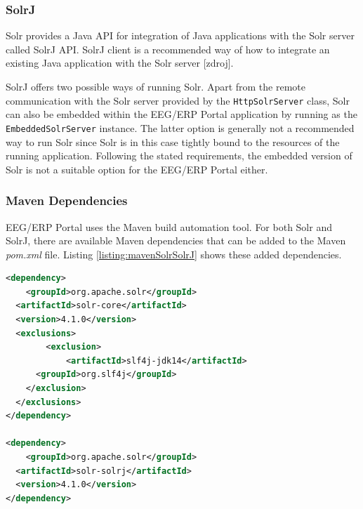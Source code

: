 \subsubsection{SolrJ}

Solr provides a Java API for integration of Java applications with the Solr server called SolrJ API.
SolrJ client is a recommended way of how to integrate an existing Java application with the Solr server [zdroj]. %

SolrJ offers two possible ways of running Solr. Apart from the remote communication with the Solr server provided by the \texttt{HttpSolrServer} class, Solr can also be embedded within the EEG/ERP Portal application by running as the \texttt{EmbeddedSolrServer} instance. 
The latter option is generally not a recommended way to run Solr since Solr is in this case tightly bound to the resources of the running application. %
Following the stated requirements, the embedded version of Solr is not a suitable option for the EEG/ERP Portal either.

\subsubsection{Maven Dependencies}

EEG/ERP Portal uses the Maven build automation tool. 
For both Solr and SolrJ, there are available Maven dependencies that can be added to the Maven \textit{pom.xml} file.
Listing \ref{listing:mavenSolrSolrJ} shows these added dependencies.

\begin{lstlisting}[language=XML, caption={Solr and SolrJ Maven Dependencies.}, label={listing:mavenSolrSolrJ}]
<dependency>
	<groupId>org.apache.solr</groupId>
  <artifactId>solr-core</artifactId>
  <version>4.1.0</version>
  <exclusions>
		<exclusion>
			<artifactId>slf4j-jdk14</artifactId>
      <groupId>org.slf4j</groupId>
    </exclusion>
  </exclusions>
</dependency>

<dependency>
	<groupId>org.apache.solr</groupId>
  <artifactId>solr-solrj</artifactId>
  <version>4.1.0</version>
</dependency>
\end{lstlisting}




